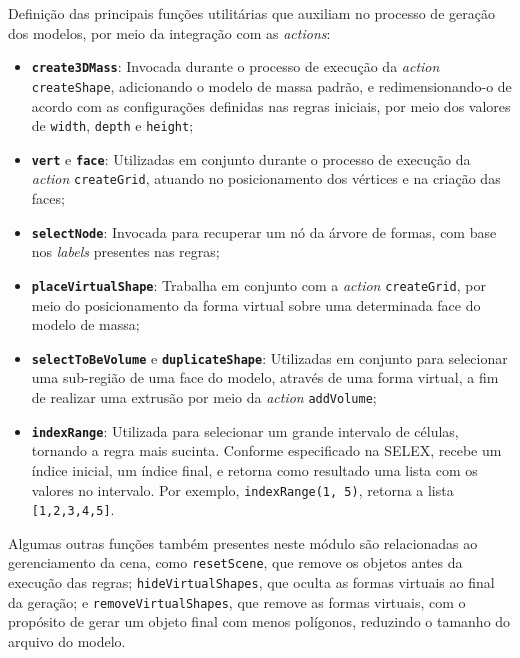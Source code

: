 Definição das principais funções utilitárias que auxiliam no processo de geração dos modelos, por meio da integração com as \textit{actions}:

\begin{itemize}
    \item \textbf{\texttt{create3DMass}}: Invocada durante o processo de execução da \textit{action} \texttt{createShape}, adicionando o modelo de massa padrão, e redimensionando-o de acordo com as configurações definidas nas regras iniciais, por meio dos valores de \texttt{width}, \texttt{depth} e \texttt{height};
    
    \item \textbf{\texttt{vert}} e \textbf{\texttt{face}}: Utilizadas em conjunto durante o processo de execução da \textit{action} \texttt{createGrid}, atuando no posicionamento dos vértices e na criação das faces;
    
    \item \textbf{\texttt{selectNode}}: Invocada para recuperar um nó da árvore de formas, com base nos \textit{labels} presentes nas regras;
    
    \item \textbf{\texttt{placeVirtualShape}}: Trabalha em conjunto com a \textit{action} \texttt{createGrid}, por meio do posicionamento da forma virtual sobre uma determinada face do modelo de massa;
    
    \item \textbf{\texttt{selectToBeVolume}} e \textbf{\texttt{duplicateShape}}: Utilizadas em conjunto para selecionar uma sub-região de uma face do modelo, através de uma forma virtual, a fim de realizar uma extrusão por meio da \textit{action} \texttt{addVolume};
    
    \item \textbf{\texttt{indexRange}}: Utilizada para selecionar um grande intervalo de células, tornando a regra mais sucinta. Conforme especificado na \gls{SELEX}, recebe um índice inicial, um índice final, e retorna como resultado uma lista com os valores no intervalo. Por exemplo, \texttt{indexRange(1,\,5)}, retorna a lista \texttt{[1,2,3,4,5]}.
\end{itemize}

Algumas outras funções também presentes neste módulo são relacionadas ao gerenciamento da cena, como \texttt{resetScene}, que remove os objetos antes da execução das regras; \texttt{hideVirtualShapes}, que oculta as formas virtuais ao final da geração; e \texttt{removeVirtualShapes}, que remove as formas virtuais, com o propósito de gerar um objeto final com menos polígonos, reduzindo o tamanho do arquivo do modelo.

